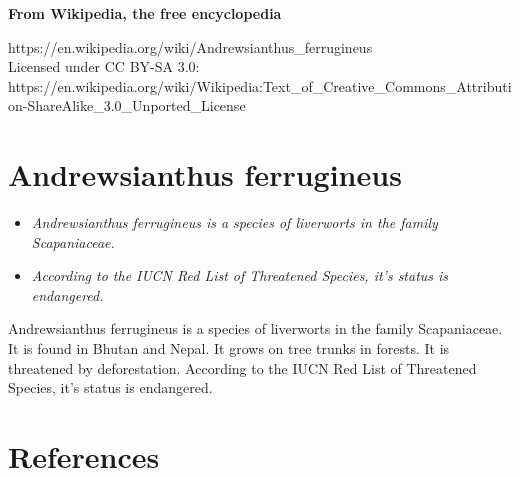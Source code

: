 \textbf{From Wikipedia, the free encyclopedia}

https://en.wikipedia.org/wiki/Andrewsianthus\_ferrugineus\\
Licensed under CC BY-SA 3.0:\\
https://en.wikipedia.org/wiki/Wikipedia:Text\_of\_Creative\_Commons\_Attribution-ShareAlike\_3.0\_Unported\_License

\section{Andrewsianthus ferrugineus}\label{andrewsianthus-ferrugineus}

\begin{itemize}
\item
  \emph{Andrewsianthus ferrugineus is a species of liverworts in the
  family Scapaniaceae.}
\item
  \emph{According to the IUCN Red List of Threatened Species, it's
  status is endangered.}
\end{itemize}

Andrewsianthus ferrugineus is a species of liverworts in the family
Scapaniaceae. It is found in Bhutan and Nepal. It grows on tree trunks
in forests. It is threatened by deforestation. According to the IUCN Red
List of Threatened Species, it's status is endangered.

\section{References}\label{references}
